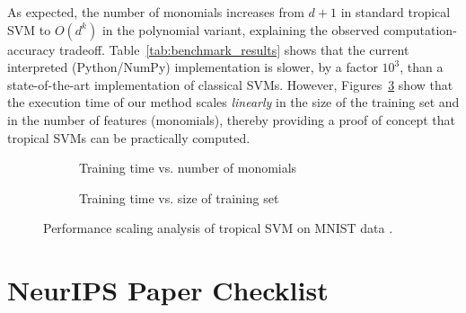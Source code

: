 \documentclass{article}
\begin{document}
As expected, the number of monomials increases from $d+1$ in standard tropical SVM to $O(d^k)$ in the polynomial variant, explaining the observed computation-accuracy tradeoff. Table~\ref{tab:benchmark_results}
shows that the current interpreted (Python/NumPy) implementation is slower, by a factor $10^3$, than a state-of-the-art implementation of classical SVMs. However, Figures~\ref{fig:scaling_analysis} show that the execution time of our method scales {\em linearly} in the size of the training set and in the number of features (monomials), thereby providing
a proof of concept that tropical SVMs can be practically computed.


\begin{figure}[htbp]
    \centering
    \begin{subfigure}{0.48\textwidth}
        \centering
        \resizebox{0.95\textwidth}{!}{}
        \caption{Training time vs. number of monomials}
        \label{fig:pca_degree_scaling}
    \end{subfigure}
    \hfill
    \begin{subfigure}{0.48\textwidth}
        \centering
        \resizebox{0.95\textwidth}{!}{}
        \caption{Training time vs. size of training set}
        \label{fig:sample_size_scaling}
    \end{subfigure}
    \caption{Performance scaling analysis of tropical SVM on MNIST data \cite{MNIST}.}
    \label{fig:scaling_analysis}
\end{figure}


\newpage
\section*{NeurIPS Paper Checklist}
\end{document}

